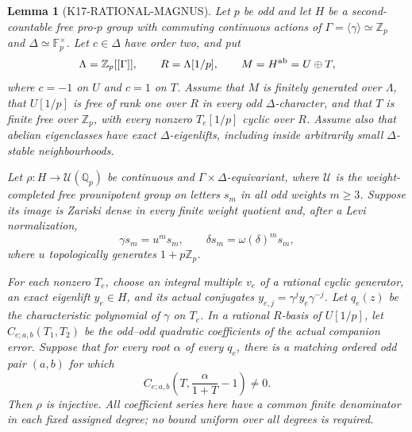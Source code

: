 \documentclass[11pt,a4paper]{article}
\newtheorem{lemma}[theorem]{Lemma}
\theoremstyle{definition}
\begin{document}
\begin{lemma}[K17-RATIONAL-MAGNUS]\label{lem:rational-magnus}
Let $p$ be odd and let $H$ be a second-countable free pro-$p$ group
with commuting continuous actions of
$\Gamma=\langle\gamma\rangle\simeq\mathbb Z_p$ and
$\Delta\simeq\mathbb F_p^\times$. Let $c\in\Delta$ have order two,
and put
\[
 \Lambda=\mathbb Z_p[[\Gamma]],\qquad R=\Lambda[1/p],\qquad
 M=H^{\rm ab}=U\oplus T,
\]
where $c=-1$ on $U$ and $c=1$ on $T$. Assume that $M$ is finitely
generated over $\Lambda$, that $U[1/p]$ is free of rank one over $R$
in every odd $\Delta$-character, and that $T$ is finite free over
$\mathbb Z_p$, with every nonzero $T_e[1/p]$ cyclic over $R$.
Assume also that abelian eigenclasses have exact $\Delta$-eigenlifts,
including inside arbitrarily small $\Delta$-stable neighbourhoods.

Let $\rho:H\to\mathcal U(\mathbb Q_p)$ be continuous and
$\Gamma\times\Delta$-equivariant, where $\mathcal U$ is the
weight-completed free prounipotent group on letters $s_m$ in all odd
weights $m\ge3$. Suppose its image is Zariski dense in every finite
weight quotient and, after a Levi normalization,
\[
 \gamma s_m=u^m s_m,\qquad \delta s_m=\omega(\delta)^m s_m,
\]
where $u$ topologically generates $1+p\mathbb Z_p$.

For each nonzero $T_e$, choose an integral multiple $v_e$ of a rational
cyclic generator, an exact eigenlift $y_e\in H$, and its actual
conjugates $y_{e,j}=\gamma^j y_e\gamma^{-j}$. Let $q_e(z)$ be the
characteristic polynomial of $\gamma$ on $T_e$. In a rational
$R$-basis of $U[1/p]$, let $C_{e;a,b}(T_1,T_2)$ be the odd--odd
quadratic coefficients of the actual companion error. Suppose that
for every root $\alpha$ of every $q_e$, there is a matching ordered
odd pair $(a,b)$ for which
\[
 C_{e;a,b}\left(T,\frac{\alpha}{1+T}-1\right)\ne0.
                                                               \tag{GM.1}
\]
Then $\rho$ is injective. All coefficient series here have a common
finite denominator in each fixed assigned degree; no bound uniform
over all degrees is required.
\end{lemma}
\end{document}
